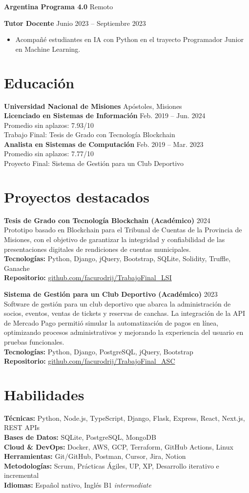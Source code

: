 \documentclass[10pt,a4paper]{article}
\newcommand{\experienceentry}[5]{
  \begingroup
  \setlength{\parskip}{0pt}
  \textbf{#1} \hfill {\color{muted}#3}\par
  \textbf{#2} \hfill {\color{muted}#4}
  #5
  \endgroup
  \vspace{4pt}
}
\newcommand{\projectentry}[5]{
  \textbf{#1} \hfill {\color{muted}#2}\\
  #3\\[-1pt]
  \textbf{Tecnologías:} #4\\[-1pt]
  \textbf{Repositorio:} \href{https://#5}{#5}\vspace{2pt}
}
\begin{document}
\experienceentry
  {Argentina Programa 4.0}
  {Tutor Docente}
  {Remoto}
  {Junio 2023 -- Septiembre 2023}
  {\begin{itemize}
    \item Acompañé estudiantes en IA con Python en el trayecto Programador Junior en Machine Learning.
  \end{itemize}}

\section{Educación}
\textbf{Universidad Nacional de Misiones} \hfill {\color{muted}Apóstoles, Misiones}\\
\textbf{Licenciado en Sistemas de Información} \hfill {\color{muted}Feb. 2019 -- Jun. 2024}\\
Promedio sin aplazos: 7.93/10\\
Trabajo Final: Tesis de Grado con Tecnología Blockchain\\[2pt]
\textbf{Analista en Sistemas de Computación} \hfill {\color{muted}Feb. 2019 -- Mar. 2023}\\
Promedio sin aplazos: 7.77/10\\
Proyecto Final: Sistema de Gestión para un Club Deportivo

\section{Proyectos destacados}
\projectentry
  {Tesis de Grado con Tecnología Blockchain \textnormal{(Académico)}}
  {2024}
  {Prototipo basado en Blockchain para el Tribunal de Cuentas de la Provincia de Misiones, con el objetivo de garantizar la integridad y confiabilidad de las presentaciones digitales de rendiciones de cuentas municipales.}
  {Python, Django, jQuery, Bootstrap, SQLite, Solidity, Truffle, Ganache}
  {github.com/facurodrij/TrabajoFinal\_LSI}

\projectentry
  {Sistema de Gestión para un Club Deportivo \textnormal{(Académico)}}
  {2023}
  {Software de gestión para un club deportivo que abarca la administración de socios, eventos, ventas de tickets y reservas de canchas. La integración de la API de Mercado Pago permitió simular la automatización de pagos en línea, optimizando procesos administrativos y mejorando la experiencia del usuario en pruebas funcionales.}
  {Python, Django, PostgreSQL, jQuery, Bootstrap}
  {github.com/facurodrij/TrabajoFinal\_ASC}

\section{Habilidades}
\textbf{Técnicas:} Python, Node.js, TypeScript, Django, Flask, Express, React, Next.js, REST APIs\\
\textbf{Bases de Datos:} SQLite, PostgreSQL, MongoDB\\
\textbf{Cloud \& DevOps:} Docker, AWS, GCP, Terraform, GitHub Actions, Linux\\
\textbf{Herramientas:} Git/GitHub, Postman, Cursor, Jira, Notion\\
\textbf{Metodologías:} Scrum, Prácticas Ágiles, UP, XP, Desarrollo iterativo e incremental\\
\textbf{Idiomas:} Español nativo, Inglés B1 \textit{intermediate}
\end{document}
